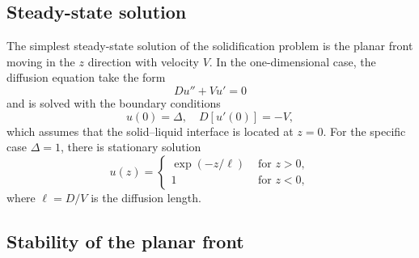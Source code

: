 \documentclass{article}
\begin{document}
\subsection{Steady-state solution}

The simplest steady-state solution of the solidification problem is the planar front
moving in the $z$ direction with velocity $V$.
In the one-dimensional case, the diffusion equation take the form
\begin{equation}\label{eq:problem_1d}
    Du'' + Vu' = 0
\end{equation}
and is solved with the boundary conditions
\begin{equation}\label{eq:bc_1d}
    u(0) = \Delta, \quad D[u'(0)] = -V,
\end{equation}
which assumes that the solid--liquid interface is located at $z=0$.
For the specific case $\Delta=1$, there is stationary solution
\begin{equation}\label{eq:solution_1d}
    u(z) = \begin{cases}
        \exp(-z/\ell) & \text{ for } z>0, \\
        1 & \text{ for } z<0,
    \end{cases}
\end{equation}
where $\ell=D/V$ is the diffusion length.

\subsection{Stability of the planar front}
\end{document}
